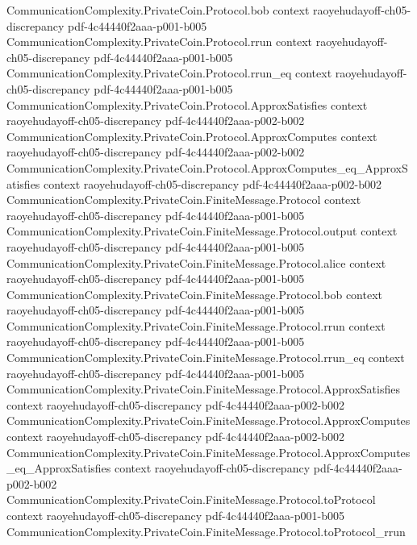 \begin{lemma}
\proofstep
  {CommunicationComplexity.PrivateCoin.Protocol.bob}
  {context}
  {raoyehudayoff-ch05-discrepancy}
  {pdf-4c44440f2aaa-p001-b005}
\proofstep
  {CommunicationComplexity.PrivateCoin.Protocol.rrun}
  {context}
  {raoyehudayoff-ch05-discrepancy}
  {pdf-4c44440f2aaa-p001-b005}
\proofstep
  {CommunicationComplexity.PrivateCoin.Protocol.rrun_eq}
  {context}
  {raoyehudayoff-ch05-discrepancy}
  {pdf-4c44440f2aaa-p001-b005}
\proofstep
  {CommunicationComplexity.PrivateCoin.Protocol.ApproxSatisfies}
  {context}
  {raoyehudayoff-ch05-discrepancy}
  {pdf-4c44440f2aaa-p002-b002}
\proofstep
  {CommunicationComplexity.PrivateCoin.Protocol.ApproxComputes}
  {context}
  {raoyehudayoff-ch05-discrepancy}
  {pdf-4c44440f2aaa-p002-b002}
\proofstep
  {CommunicationComplexity.PrivateCoin.Protocol.ApproxComputes_eq_ApproxSatisfies}
  {context}
  {raoyehudayoff-ch05-discrepancy}
  {pdf-4c44440f2aaa-p002-b002}
\proofstep
  {CommunicationComplexity.PrivateCoin.FiniteMessage.Protocol}
  {context}
  {raoyehudayoff-ch05-discrepancy}
  {pdf-4c44440f2aaa-p001-b005}
\proofstep
  {CommunicationComplexity.PrivateCoin.FiniteMessage.Protocol.output}
  {context}
  {raoyehudayoff-ch05-discrepancy}
  {pdf-4c44440f2aaa-p001-b005}
\proofstep
  {CommunicationComplexity.PrivateCoin.FiniteMessage.Protocol.alice}
  {context}
  {raoyehudayoff-ch05-discrepancy}
  {pdf-4c44440f2aaa-p001-b005}
\proofstep
  {CommunicationComplexity.PrivateCoin.FiniteMessage.Protocol.bob}
  {context}
  {raoyehudayoff-ch05-discrepancy}
  {pdf-4c44440f2aaa-p001-b005}
\proofstep
  {CommunicationComplexity.PrivateCoin.FiniteMessage.Protocol.rrun}
  {context}
  {raoyehudayoff-ch05-discrepancy}
  {pdf-4c44440f2aaa-p001-b005}
\proofstep
  {CommunicationComplexity.PrivateCoin.FiniteMessage.Protocol.rrun_eq}
  {context}
  {raoyehudayoff-ch05-discrepancy}
  {pdf-4c44440f2aaa-p001-b005}
\proofstep
  {CommunicationComplexity.PrivateCoin.FiniteMessage.Protocol.ApproxSatisfies}
  {context}
  {raoyehudayoff-ch05-discrepancy}
  {pdf-4c44440f2aaa-p002-b002}
\proofstep
  {CommunicationComplexity.PrivateCoin.FiniteMessage.Protocol.ApproxComputes}
  {context}
  {raoyehudayoff-ch05-discrepancy}
  {pdf-4c44440f2aaa-p002-b002}
\proofstep
  {CommunicationComplexity.PrivateCoin.FiniteMessage.Protocol.ApproxComputes_eq_ApproxSatisfies}
  {context}
  {raoyehudayoff-ch05-discrepancy}
  {pdf-4c44440f2aaa-p002-b002}
\proofstep
  {CommunicationComplexity.PrivateCoin.FiniteMessage.Protocol.toProtocol}
  {context}
  {raoyehudayoff-ch05-discrepancy}
  {pdf-4c44440f2aaa-p001-b005}
\proofstep
  {CommunicationComplexity.PrivateCoin.FiniteMessage.Protocol.toProtocol_rrun}

\end{lemma}
